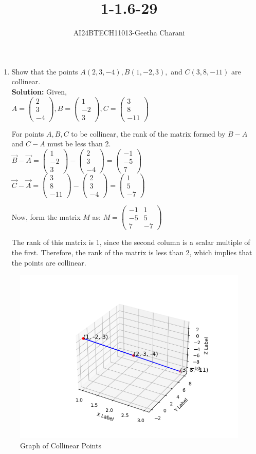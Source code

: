 \documentclass[journal,12pt,onecolumn]{IEEEtran}
\newcommand{\myvec}[1]{\begin{pmatrix} #1 \end{pmatrix}}
\newcommand{\brak}[1]{\left( #1 \right)}
\begin{document}


\vspace{3cm}
\title{1-1.6-29}
\author{AI24BTECH11013-Geetha Charani}
\maketitle
\bigskip

\renewcommand{\thefigure}{\theenumi}
\renewcommand{\thetable}{\theenumi}

\begin{enumerate}
    \item Show that the points \( A\brak{2, 3, -4}, B\brak{1, -2, 3}, \) and \( C\brak{3, 8, -11} \) are collinear.\\
    
    \textbf{Solution:} Given,\\
    $
    A = \myvec{2 \\ 3\\ -4}, B = \myvec{1 \\ -2 \\ 3}, C = \myvec{3 \\ 8 \\ -11}
    $
    
    For points $ A, B, C $ to be collinear, the rank of the matrix formed by $ B - A $ and $ C - A $ must be less than 2.\\
    
    $
    \Vec{B} - \Vec{A} = \myvec{1 \\ -2 \\ 3} - \myvec{2 \\ 3 \\ -4} = \myvec{-1 \\ -5 \\ 7}
    $
    $
    \Vec{C} - \Vec{A} = \myvec{3 \\ 8 \\ -11} - \myvec{2 \\ 3 \\ -4} = \myvec{1 \\ 5 \\ -7}
    $
    
    Now, form the matrix $ M $ as:
    $
    M = \myvec{-1 & 1 \\ -5 & 5 \\ 7 & -7}
    $
    
		The rank of this matrix is 1, since the second column is a scalar multiple of the first. Therefore, the rank of the matrix is less than 2, which implies that the points are collinear.
\end{enumerate}

\begin{figure}[ht]
   \centering
   \includegraphics[width=0.7\linewidth]{figs/fig_1.png}
   \caption{Graph of Collinear Points}
   \label{q1}
\end{figure}
\end{document}
